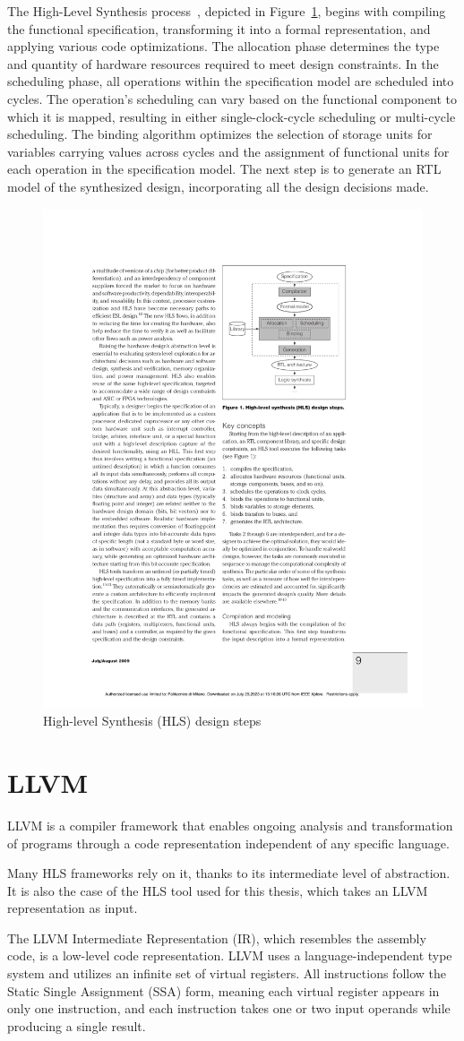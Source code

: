 The High-Level Synthesis process~\cite{5209958}, depicted in Figure~\ref{fig:hls}, begins with compiling the functional specification, transforming it into a formal representation, and applying various code optimizations.
The allocation phase determines the type and quantity of hardware resources required to meet design constraints.
In the scheduling phase, all operations within the specification model are scheduled into cycles.
The operation's scheduling can vary based on the functional component to which it is mapped, resulting in either single-clock-cycle scheduling or multi-cycle scheduling.
The binding algorithm optimizes the selection of storage units for variables carrying values across cycles and the assignment of functional units for each operation in the specification model.
The next step is to generate an RTL model of the synthesized design, incorporating all the design decisions made.

\begin{figure}[t]
    \centering
    \includegraphics[height=0.4\textwidth]{Images/hls}
    \caption{High-level Synthesis (HLS) design steps~\cite{5209958}}
    \label{fig:hls}
\end{figure}

\section{LLVM}
\label{sec:llvm}%

LLVM is a compiler framework that enables ongoing analysis and transformation of programs through a code representation independent of any specific language.

Many HLS frameworks rely on it, thanks to its intermediate level of abstraction.
It is also the case of the HLS tool used for this thesis, which takes an LLVM representation as input.

The LLVM Intermediate Representation (IR), which resembles the assembly code, is a low-level code representation.
LLVM uses a language-independent type system and utilizes an infinite set of virtual registers.
All instructions follow the Static Single Assignment (SSA) form, meaning each virtual register appears in only one instruction, and each instruction takes one or two input operands while producing a single result.

